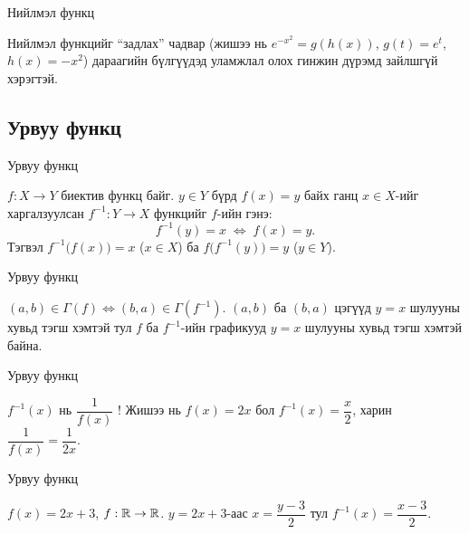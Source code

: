 \begin{frame}[allowframebreaks]{Нийлмэл функц}
\begin{remark}
Нийлмэл функцийг ``задлах'' чадвар (жишээ нь $e^{-x^2}=g(h(x))$, $g(t)=e^t$, $h(x)=-x^2$)
дараагийн бүлгүүдэд уламжлал олох гинжин дүрэмд зайлшгүй хэрэгтэй.
\end{remark}
\end{frame}

\subsection{Урвуу функц}
\begin{frame}[allowframebreaks]{Урвуу функц}
\begin{definition}
$f:X\to Y$ биектив функц байг. $y\in Y$ бүрд $f(x)=y$ байх ганц $x\in X$-ийг
харгалзуулсан $f^{-1}:Y\to X$ функцийг $f$-ийн  гэнэ:
\[
f^{-1}(y)=x \;\Longleftrightarrow\; f(x)=y.
\]
Тэгвэл $f^{-1}\bigl(f(x)\bigr)=x$ \;($x\in X$) ба $f\bigl(f^{-1}(y)\bigr)=y$ \;($y\in Y$).
\end{definition}
\end{frame}

\begin{frame}[allowframebreaks]{Урвуу функц}
\begin{remark}
$(a,b)\in\Gamma(f) \Longleftrightarrow (b,a)\in\Gamma(f^{-1})$. $(a,b)$ ба $(b,a)$ цэгүүд
$y=x$ шулууны хувьд тэгш хэмтэй тул $f$ ба $f^{-1}$-ийн графикууд $y=x$ шулууны хувьд
тэгш хэмтэй байна.
\end{remark}
\end{frame}

\begin{frame}[allowframebreaks]{Урвуу функц}
\begin{remark}
$f^{-1}(x)$ нь $\dfrac{1}{f(x)}$ ! Жишээ нь $f(x)=2x$ бол
$f^{-1}(x)=\dfrac{x}{2}$, харин $\dfrac{1}{f(x)}=\dfrac{1}{2x}$.
\end{remark}
\end{frame}

\begin{frame}[allowframebreaks]{Урвуу функц}
\begin{example}
$f(x)=2x+3$, $f:\mathbb{R}\to\mathbb{R}$. $y=2x+3$-аас $x=\dfrac{y-3}{2}$ тул
$f^{-1}(x)=\dfrac{x-3}{2}$.
\end{example}
\end{frame}

